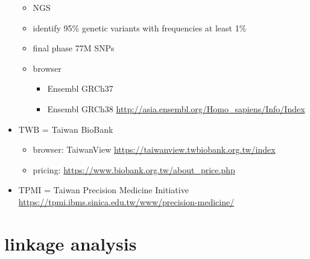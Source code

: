 \documentclass[
]{book}
\providecommand{\tightlist}{%
  \setlength{\itemsep}{0pt}\setlength{\parskip}{0pt}}
\theoremstyle{definition}
\theoremstyle{definition}
\theoremstyle{definition}
\theoremstyle{definition}
\theoremstyle{remark}
\begin{document}
\begin{itemize}
  \begin{itemize}
  \tightlist
  \item
    NGS
  \item
    identify 95\% genetic variants with frequencies at least 1\%
  \item
    final phase 77M SNPs
  \item
    browser

    \begin{itemize}
    \tightlist
    \item
      Ensembl GRCh37
    \item
      Ensembl GRCh38 \url{http://asia.ensembl.org/Homo_sapiens/Info/Index}
    \end{itemize}
  \end{itemize}
\item
  TWB = Taiwan BioBank

  \begin{itemize}
  \tightlist
  \item
    browser: TaiwanView \url{https://taiwanview.twbiobank.org.tw/index}
  \item
    pricing: \url{https://www.biobank.org.tw/about_price.php}
  \end{itemize}
\item
  TPMI = Taiwan Precision Medicine Initiative \url{https://tpmi.ibms.sinica.edu.tw/www/precision-medicine/}
\end{itemize}

\section{linkage analysis}\label{linkage-analysis}
\end{document}
